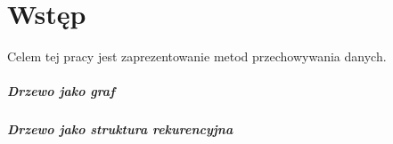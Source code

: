 \chapter*{Wstęp}


Celem tej pracy jest zaprezentowanie metod przechowywania danych. 

\paragraph{Drzewo jako graf}

\paragraph{Drzewo jako struktura rekurencyjna}

